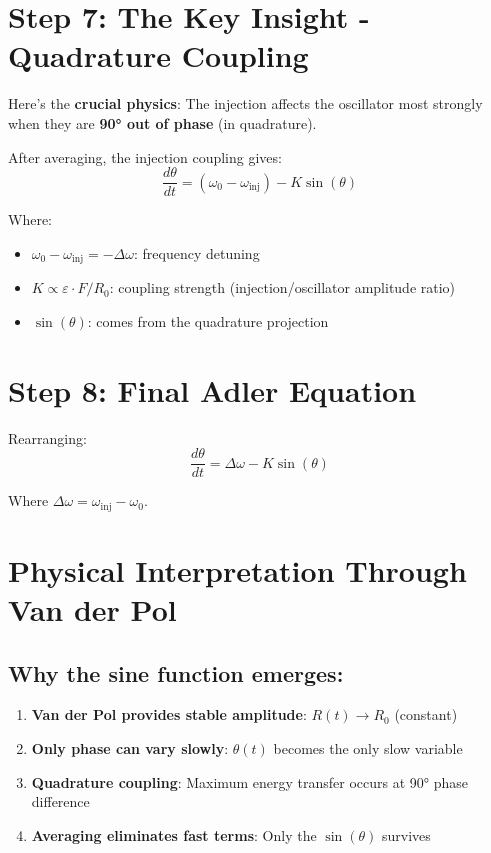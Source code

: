 \documentclass{article}
\begin{document}
\section{Step 7: The Key Insight - Quadrature Coupling}

Here's the \textbf{crucial physics}: The injection affects the oscillator most strongly when they are \textbf{90° out of phase} (in quadrature).

After averaging, the injection coupling gives:
\begin{equation}
\frac{d\theta}{dt} = (\omega_0 - \omega_{\text{inj}}) - K \sin(\theta)
\end{equation}

Where:
\begin{itemize}
    \item $\omega_0 - \omega_{\text{inj}} = -\Delta\omega$: frequency detuning
    \item $K \propto \varepsilon \cdot F/R_0$: coupling strength (injection/oscillator amplitude ratio)
    \item $\sin(\theta)$: comes from the quadrature projection
\end{itemize}

\section{Step 8: Final Adler Equation}

Rearranging:
\begin{equation}
\frac{d\theta}{dt} = \Delta\omega - K \sin(\theta)
\end{equation}

Where $\Delta\omega = \omega_{\text{inj}} - \omega_0$.

\section{Physical Interpretation Through Van der Pol}

\subsection{Why the sine function emerges:}

\begin{enumerate}
    \item \textbf{Van der Pol provides stable amplitude}: $R(t) \rightarrow R_0$ (constant)
    \item \textbf{Only phase can vary slowly}: $\theta(t)$ becomes the only slow variable
    \item \textbf{Quadrature coupling}: Maximum energy transfer occurs at 90° phase difference
    \item \textbf{Averaging eliminates fast terms}: Only the $\sin(\theta)$ survives
\end{enumerate}
\end{document}
